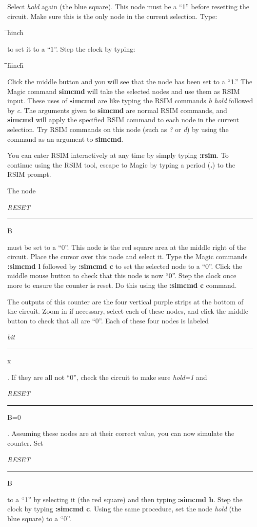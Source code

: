 \documentclass[letterpaper,twoside,12pt]{article}
\def\hinch{\hspace*{0.5in}}
\def\starti{\begin{center}\begin{tabbing}\hinch\=\hinch\=\hinch\=hinch\hinch\=\kill}
\def\endi{\end{tabbing}\end{center}}
\def\ii{\>\>\>}
\def\_{\rule{0.6em}{0.5pt}}
\begin{document}
Select {\itshape hold} again (the blue square).
This node must be a ``1'' before resetting the circuit.  Make sure this is
the only node in the current selection.  Type:

\starti
   \ii {\bfseries :simcmd h}
\endi

to set it to a ``1''.  Step the clock by typing:

\starti
   \ii {\bfseries :simcmd c}
\endi

Click the middle button and you will see that the node has been
set to a ``1.''  The Magic command {\bfseries simcmd} will take the selected
nodes and use them as RSIM input.  These uses of {\bfseries simcmd}
are like typing the RSIM commands {\itshape h hold} followed by
{\itshape c}.  The arguments given to {\bfseries simcmd} are normal RSIM commands, and
{\bfseries simcmd} will apply the specified RSIM command to each node in 
the current selection.  
Try RSIM commands on this node (such as
{\itshape ?} or {\itshape d}) by using the command as an
argument to {\bfseries simcmd}.  

You can enter RSIM interactively
at any time
by simply typing {\bfseries :rsim}.  To continue using the RSIM tool,
escape to Magic by typing a period ({\bfseries .}) to the RSIM prompt.

The node {\itshape RESET{\_}B} must be set to a ``0''.  This node is the 
red square area at the middle right of the circuit.  Place the cursor
over this node and select it.  Type
the Magic commands {\bfseries :simcmd l} followed by {\bfseries :simcmd c} to
set the selected node to a ``0''.  Click the middle mouse button to
check that this node is now ``0''.  Step the clock once more to
ensure the counter is reset.  Do this using the {\bfseries :simcmd c}
command.

The outputs of this counter are the four vertical purple strips at the
bottom of the circuit.  
Zoom in if necessary, select each of these
nodes, and click the middle button to check that all are ``0''.  Each of
these four nodes is labeled {\itshape bit{\_}x}.  If they are all not ``0'', 
check the circuit to make sure {\itshape hold=1} and {\itshape RESET{\_}B=0}.
Assuming these nodes are at their correct value, you can now 
simulate the counter.  Set {\itshape RESET{\_}B} to a ``1'' by selecting it (the 
red square) and then typing {\bfseries :simcmd h}.  Step the
clock by typing {\bfseries :simcmd c}.  Using the same procedure, set
the node {\itshape hold} (the blue square) to a ``0''.
\end{document}
